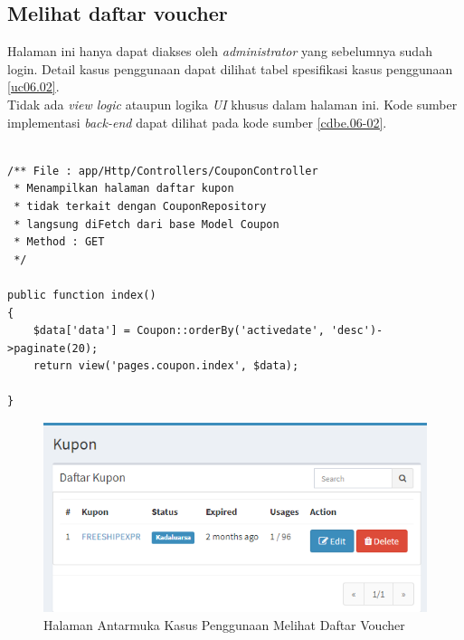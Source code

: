 \subsection{Melihat daftar voucher}
Halaman ini hanya dapat diakses oleh \textit{administrator} yang sebelumnya sudah login. Detail kasus penggunaan dapat dilihat tabel spesifikasi kasus penggunaan \ref{uc06.02}.\\
\indent Tidak ada \textit{view logic} ataupun logika \textit{UI} khusus dalam halaman ini. Kode sumber implementasi \textit{back-end} dapat dilihat pada kode sumber \ref{cdbe.06-02}.

\begin{lstlisting}[label=cdbe.06-02,style=php,caption=Kode Sumber Antarmuka Registrasi]

/** File : app/Http/Controllers/CouponController
 * Menampilkan halaman daftar kupon
 * tidak terkait dengan CouponRepository
 * langsung diFetch dari base Model Coupon
 * Method : GET
 */

public function index()
{
    $data['data'] = Coupon::orderBy('activedate', 'desc')->paginate(20);
    return view('pages.coupon.index', $data);

}
\end{lstlisting}
      
  \begin{figure}[H]
    \centering
    \includegraphics[width=\textwidth]{images/bab4/ui/06-02.png}
    \caption{Halaman Antarmuka Kasus Penggunaan Melihat Daftar Voucher}
    \label{ui.06-02}
  \end{figure}
      
